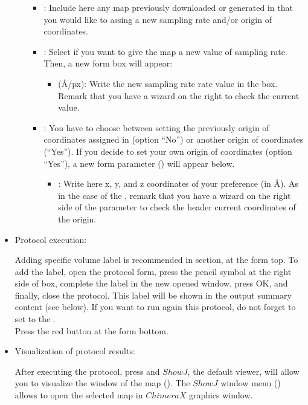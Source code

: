 \begin{itemize}
\begin{itemize}
  \begin{itemize}
   \item {}: Include here any map previously downloaded or generated in \scipion that you would like to assing a new sampling rate and/or origin of coordinates.
   \item {}: Select  if you want to give the map a new value of sampling rate. Then, a new form box will appear:
    \begin{itemize}
    \item {} (\AA/px): Write the new sampling rate rate value in the box. Remark that you have a wizard on the right to check the current value.
    \end{itemize}
   \item {}: You have to choose between setting the previously origin of coordinates assigned in \scipion (option ``No'') or another origin of coordinates (``Yes''). If you decide to set your own origin of coordinates (option ``Yes''), a new form parameter () will appear below.
    \begin{itemize}
   \item {}: Write here x, y, and z coordinates of your preference (in \AA). As in the case of the , remark that you have a wizard on the right side of the parameter to check the header current coordinates of the origin. 
    \end{itemize}
   \end{itemize}
   
  
  \end{itemize}
  \item Protocol execution:
  
  Adding specific volume label is recommended in  section, at the form top. To add the label, open the protocol form, press the pencil symbol at the right side of  box, complete the label in the new opened window, press OK, and finally, close the protocol. This label will be shown in the output summary content (see below). If you want to run again this protocol, do not forget to set to  the .\\
  Press the  red button at the form bottom.
  
  \item Visualization of protocol results:
  
  After executing the protocol, press  and $ShowJ$, the default \scipion viewer, will allow you to visualize the  window of the map  (). The $ShowJ$ window menu () allows to open the selected map in $ChimeraX$ graphics window.
   

\end{itemize}
